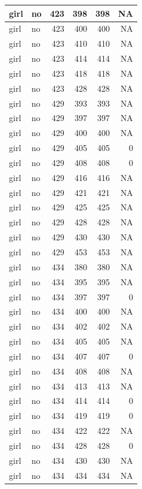 \documentclass[man]{apa6}
\begin{document}
\begin{tabular}{l|l|r|r|r|r}
\hline
girl & no & 423 & 398 & 398 & NA\\
\hline
girl & no & 423 & 400 & 400 & NA\\
\hline
girl & no & 423 & 410 & 410 & NA\\
\hline
girl & no & 423 & 414 & 414 & NA\\
\hline
girl & no & 423 & 418 & 418 & NA\\
\hline
girl & no & 423 & 428 & 428 & NA\\
\hline
girl & no & 429 & 393 & 393 & NA\\
\hline
girl & no & 429 & 397 & 397 & NA\\
\hline
girl & no & 429 & 400 & 400 & NA\\
\hline
girl & no & 429 & 405 & 405 & 0\\
\hline
girl & no & 429 & 408 & 408 & 0\\
\hline
girl & no & 429 & 416 & 416 & NA\\
\hline
girl & no & 429 & 421 & 421 & NA\\
\hline
girl & no & 429 & 425 & 425 & NA\\
\hline
girl & no & 429 & 428 & 428 & NA\\
\hline
girl & no & 429 & 430 & 430 & NA\\
\hline
girl & no & 429 & 453 & 453 & NA\\
\hline
girl & no & 434 & 380 & 380 & NA\\
\hline
girl & no & 434 & 395 & 395 & NA\\
\hline
girl & no & 434 & 397 & 397 & 0\\
\hline
girl & no & 434 & 400 & 400 & NA\\
\hline
girl & no & 434 & 402 & 402 & NA\\
\hline
girl & no & 434 & 405 & 405 & NA\\
\hline
girl & no & 434 & 407 & 407 & 0\\
\hline
girl & no & 434 & 408 & 408 & NA\\
\hline
girl & no & 434 & 413 & 413 & NA\\
\hline
girl & no & 434 & 414 & 414 & 0\\
\hline
girl & no & 434 & 419 & 419 & 0\\
\hline
girl & no & 434 & 422 & 422 & NA\\
\hline
girl & no & 434 & 428 & 428 & 0\\
\hline
girl & no & 434 & 430 & 430 & NA\\
\hline
girl & no & 434 & 434 & 434 & NA\\

\end{tabular}
\end{document}
